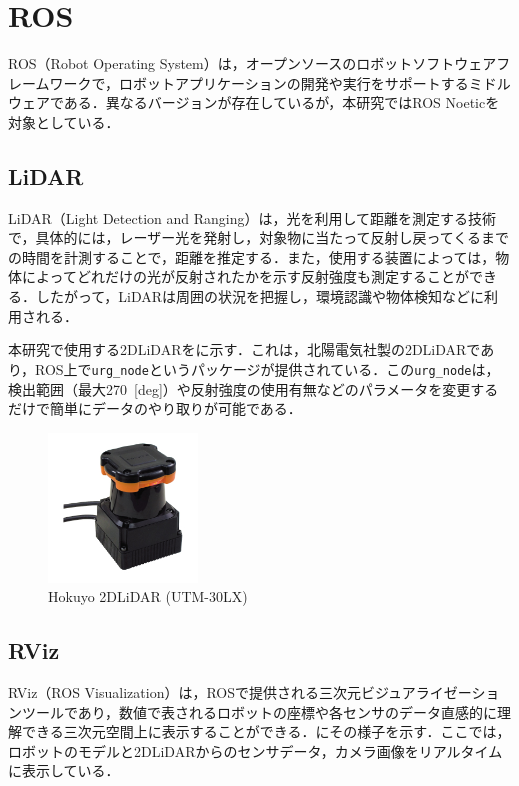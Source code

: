 
\section{ROS}

ROS（Robot Operating System）は，オープンソースのロボットソフトウェアフレームワークで，ロボットアプリケーションの開発や実行をサポートするミドルウェアである．異なるバージョンが存在しているが，本研究ではROS Noeticを対象としている．

\subsection{LiDAR}

  LiDAR（Light Detection and Ranging）は，光を利用して距離を測定する技術で，具体的には，レーザー光を発射し，対象物に当たって反射し戻ってくるまでの時間を計測することで，距離を推定する．また，使用する装置によっては，物体によってどれだけの光が反射されたかを示す反射強度も測定することができる．したがって，LiDARは周囲の状況を把握し，環境認識や物体検知などに利用される．

  本研究で使用する2DLiDARをに示す．これは，北陽電気社製の2DLiDARであり，ROS上で\texttt{urg\_node}\cite{urg_node}というパッケージが提供されている．この\texttt{urg\_node}は，検出範囲（最大270 \,[deg]）や反射強度の使用有無などのパラメータを変更するだけで簡単にデータのやり取りが可能である．

  \begin{figure}[h]
    \centering
    \includegraphics[keepaspectratio, scale=0.80] {images/RobotGuidance_hokuyo_lidar.png}
    \caption{Hokuyo 2DLiDAR (UTM-30LX) \cite{hokuyo}}
    \label{Fig:hokuyo_lidar}
  \end{figure}

\newpage

\subsection{RViz}

  RViz（ROS Visualization）\cite{rviz}は，ROSで提供される三次元ビジュアライゼーションツールであり，数値で表されるロボットの座標や各センサのデータ直感的に理解できる三次元空間上に表示することができる．にその様子を示す．ここでは，ロボットのモデルと2DLiDARからのセンサデータ，カメラ画像をリアルタイムに表示している．

